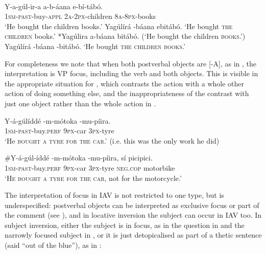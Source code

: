 \documentclass[output=paper]{langsci/langscibook}
\begin{document}
\ea\label{ex:vanderwal:5} \citet[228--229]{HymanKatamba1993} \\
\settowidth{\jamwidth}{[-A, +A]}
\ea\label{ex:vanderwal:5a}{
\gll Y-a-gúl-ir-a      a-b-áana    e-bí-tábó.  \\
       1\textsc{sm}-\textsc{past}-buy-\textsc{appl }   \textsc{2a-2px}-children  \textsc{8a-8px}-books\\\jambox{\textup{[+A, +A]}}
}
\glt   ‘He bought the children books.’             
\ex\label{ex:vanderwal:5b}  Yagúlírá {\longrule}-báana ebitábó.             \jambox{\textup{[-A, +A]}}
\glt   ‘He bought \textsc{the children} books.’           
\ex \label{ex:vanderwal:5c} *Yagúlira a-báana {\longrule}bitábó.            \jambox{\textup{[+A, -A]}}
\glt   (‘He bought the children \textsc{books}.’)           
\ex  \label{ex:vanderwal:5d} {Yagúlírá {\longrule}-báana {\longrule}-bitábó.}            \jambox{\textup{[-A, -A]}}
\glt  ‘He bought \textsc{the children books}.’
\z
\z

For completeness we note that when both postverbal objects are [-A], as in , the interpretation is VP focus, including the verb and both objects. This is visible in the appropriate situation for , which contrasts the action with a whole other action of doing something else, and the inappropriateness of the contrast with just one object rather than the whole action in .

\settowidth{\jamwidth}{[-A, +A]}
\ea\label{ex:vanderwal:6}{
\gll Y-á-gúlíddé    {\longrule}-m-mótoka    {\longrule}-mu-píira.      \\
 \textsc{1sm-past}-buy.\textsc{perf}       \textsc{9px}-car              \textsc{3px}-tyre\\\jambox{\textup{[-A, -A]}}
}
\glt‘He \textsc{bought a tyre for the car}.’ (i.e. this was the only work he did) 
\z

\settowidth{\jamwidth}{[-A, +A]}
\ea\label{ex:vanderwal:7}{
\gll \#Y-á-gúl-íddé      {\longrule}-m-mótoka    {\longrule}-mu-píira,  sí    picipici.\\
     \textsc{1sm-past}-buy.\textsc{perf   }    \textsc{9px}-car       \textsc{3px}-tyre   \textsc{neg}.\textsc{cop}  motorbike\\\jambox{\textup{[-A, -A]}}
}
\glt   ‘\textsc{He bought a tyre for the car}, not for the motorcycle.’
\z

The interpretation of focus in IAV is not restricted to one type, but is underspecified: postverbal objects can be interpreted as exclusive focus or part of the comment (see ), and in locative inversion the subject can occur in IAV too. In subject inversion, either the subject is in focus, as in the question in  and the narrowly focused subject in , or it is just detopicalised as part of a thetic sentence (said “out of the blue”), as in :
\end{document}
